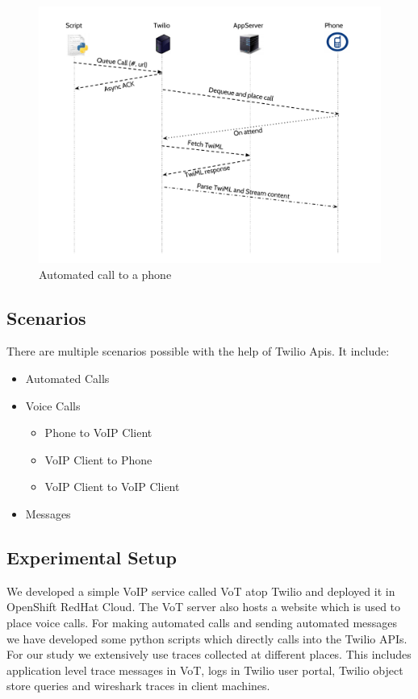 \begin{figure}[t!] 
\centering
  \includegraphics[width=\textwidth]{figs/auto.pdf}
\caption{Automated call to a phone}
\label{fig:autocall}
\end{figure} 

\subsection{Scenarios}

There are multiple scenarios possible with the help of Twilio Apis. It include:

\begin{itemize}
\item Automated Calls
\item Voice Calls
\begin{itemize}
\item Phone to VoIP Client
\item VoIP Client to Phone
\item VoIP Client to VoIP Client
\end{itemize}
\item Messages
\end{itemize}

\subsection{Experimental Setup}

We developed a simple VoIP service called VoT atop Twilio and deployed it in OpenShift RedHat Cloud. The VoT server also hosts a website which is used to place voice calls. For making automated calls and sending automated messages we have developed some python scripts which directly calls into the Twilio APIs. For our study we extensively use traces collected at different places. This includes application level trace messages in VoT, logs in Twilio user portal, Twilio object store queries and wireshark traces in client machines.

